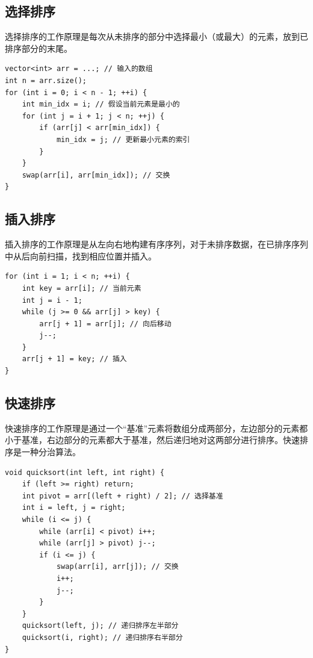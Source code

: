 \documentclass{article}
\begin{document}
\subsection{选择排序}

选择排序的工作原理是每次从未排序的部分中选择最小（或最大）的元素，放到已排序部分的末尾。

\begin{lstlisting}
vector<int> arr = ...; // 输入的数组
int n = arr.size();
for (int i = 0; i < n - 1; ++i) {
    int min_idx = i; // 假设当前元素是最小的
    for (int j = i + 1; j < n; ++j) {
        if (arr[j] < arr[min_idx]) {
            min_idx = j; // 更新最小元素的索引
        }
    }
    swap(arr[i], arr[min_idx]); // 交换
}
\end{lstlisting}

\subsection{插入排序}

插入排序的工作原理是从左向右地构建有序序列，对于未排序数据，在已排序序列中从后向前扫描，找到相应位置并插入。

\begin{lstlisting}
for (int i = 1; i < n; ++i) {
    int key = arr[i]; // 当前元素
    int j = i - 1;
    while (j >= 0 && arr[j] > key) {
        arr[j + 1] = arr[j]; // 向后移动
        j--;
    }
    arr[j + 1] = key; // 插入
}
\end{lstlisting}

\subsection{快速排序}

快速排序的工作原理是通过一个“基准”元素将数组分成两部分，左边部分的元素都小于基准，右边部分的元素都大于基准，然后递归地对这两部分进行排序。快速排序是一种分治算法。

\begin{lstlisting}
void quicksort(int left, int right) {
    if (left >= right) return;
    int pivot = arr[(left + right) / 2]; // 选择基准
    int i = left, j = right;
    while (i <= j) {
        while (arr[i] < pivot) i++;
        while (arr[j] > pivot) j--;
        if (i <= j) {
            swap(arr[i], arr[j]); // 交换
            i++;
            j--;
        }
    }
    quicksort(left, j); // 递归排序左半部分
    quicksort(i, right); // 递归排序右半部分
}
\end{lstlisting}
\end{document}
